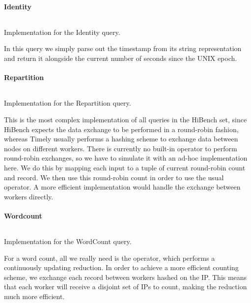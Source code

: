\paragraph{Identity}
\begin{listing}[H]
  \inputminted[firstline=95,lastline=96]{rust}{benchmarks/src/hibench.rs}
  \caption{Implementation for the Identity query.}
  \label{lst:hibench-identity}
\end{listing}

In this query we simply parse out the timestamp from its string representation and return it alongside the current number of seconds since the UNIX epoch.

\paragraph{Repartition}
\begin{listing}[H]
  \inputminted[firstline=127,lastline=139]{rust}{benchmarks/src/hibench.rs}
  \caption{Implementation for the Repartition query.}
  \label{lst:hibench-repartition}
\end{listing}

This is the most complex implementation of all queries in the HiBench set, since HiBench expects the data exchange to be performed in a round-robin fashion, whereas Timely usually performs a hashing scheme to exchange data between nodes on different workers. There is currently no built-in operator to perform round-robin exchanges, so we have to simulate it with an ad-hoc implementation here. We do this by mapping each input to a tuple of current round-robin count and record. We then use this round-robin count in order to use the usual  operator. A more efficient implementation would handle the exchange between workers directly.

\paragraph{Wordcount}
\begin{listing}[H]
  \inputminted[firstline=170,lastline=172]{rust}{benchmarks/src/hibench.rs}
  \caption{Implementation for the WordCount query.}
  \label{lst:hibench-wordcount}
\end{listing}

For a word count, all we really need is the  operator, which performs a continuously updating reduction. In order to achieve a more efficient counting scheme, we exchange each record between workers hashed on the IP. This means that each worker will receive a disjoint set of IPs to count, making the reduction much more efficient.

